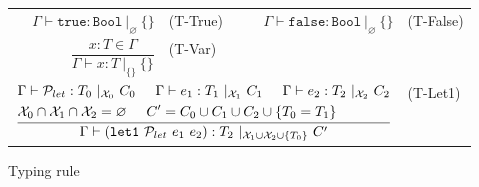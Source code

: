 \documentclass{article}
\begin{document}
\begin{figure}
    \centering
    \begin{tabular}{rlrl}
    $\Gamma \vdash \mathtt{true} : \mathtt{Bool}\ |_\varnothing\ \{\}$ & (T-True) &
    $\Gamma \vdash \mathtt{false} : \mathtt{Bool}\ |_\varnothing\ \{\}$ & (T-False) \vspace{5mm} \\

    $\dfrac{x : T \in \Gamma}{\Gamma \vdash x : T\ |_{\{\}}\ \{\}}$ & (T-Var) \vspace{5mm} \\


    \multicolumn{3}{r}{
    $\dfrac{\begin{aligned}
    &\Gamma \vdash \mathcal{P}_{let} : T_0\ |_{\mathcal{X}_0}\ C_0 \hspace{5mm}
    \Gamma \vdash e_1 : T_1\ |_{\mathcal{X}_1}\ C_1 \hspace{5mm}
    \Gamma \vdash e_2 : T_2\ |_{\mathcal{X}_2}\ C_2\\
    &\mathcal{X}_0 \cap \mathcal{X}_1 \cap \mathcal{X}_2 = \varnothing \hspace{5mm}
    C' = C_0 \cup C_1 \cup C_2 \cup \{ T_0 = T_1 \}
    \end{aligned}}{\Gamma \vdash (\mathtt{let1}\ \mathcal{P}_{let}\ e_1\ e_2) : T_2\ |_{\mathcal{X}_1 \cup \mathcal{X}_2 \cup \{T_0\}}\ C'}$} & (T-Let1)
    \end{tabular}
    \caption{Typing rule}
\end{figure}
\end{document}
